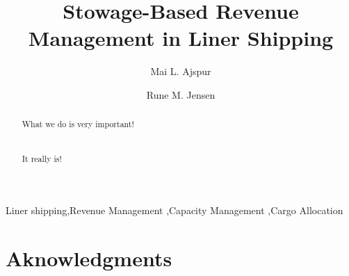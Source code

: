 \documentclass[a4paper,fleqn]{cas-sc}
\begin{document}
\let\WriteBookmarks\relax
\def\floatpagepagefraction{1}
\def\textpagefraction{.001}

\title[mode = title]{Stowage-Based Revenue Management in Liner Shipping}                      

\author[1]{Mai L. Ajspur}
\address[1]{Rued Langgaards Vej 7, 2300 Copenhagen S, Denmark}

\author[1]{Rune M. Jensen}
\cormark[1]


\begin{abstract}
What we do is very important!\\\\\\It really is!
\end{abstract}



\begin{keywords}
Liner shipping\sep Revenue Management \sep Capacity Management \sep Cargo Allocation%
\end{keywords}

\maketitle








\section*{Aknowledgments}



%

%

\end{document}
